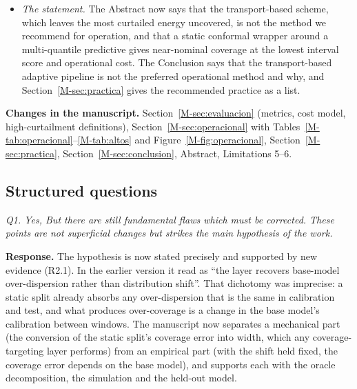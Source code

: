 \documentclass[11pt,a4paper]{article}
\newenvironment{revcomment}
  {\begin{mdframed}[backgroundcolor=quotebg,linecolor=quoterule,linewidth=0.4pt,
    innertopmargin=6pt,innerbottommargin=6pt,skipabove=8pt,skipbelow=8pt]\itshape}
  {\end{mdframed}}
\newcommand{\resp}{\textbf{Response.} }
\newcommand{\where}[1]{\textbf{Changes in the manuscript.} #1}
\begin{document}
\begin{itemize}[leftmargin=*,itemsep=1pt]
\item \emph{The statement.} The Abstract now says that the transport-based scheme, which leaves the most curtailed energy uncovered, is not the method we recommend for operation, and that a static conformal wrapper around a multi-quantile predictive gives near-nominal coverage at the lowest interval score and operational cost. The Conclusion says that the transport-based adaptive pipeline is not the preferred operational method and why, and Section~\ref{M-sec:practica} gives the recommended practice as a list.
\end{itemize}

\where{Section~\ref{M-sec:evaluacion} (metrics, cost model, high-curtailment definitions), Section~\ref{M-sec:operacional} with Tables~\ref{M-tab:operacional}--\ref{M-tab:altos} and Figure~\ref{M-fig:operacional}, Section~\ref{M-sec:practica}, Section~\ref{M-sec:conclusion}, Abstract, Limitations 5--6.}

\subsection*{Structured questions}

\begin{revcomment}
Q1. Yes, But there are still fundamental flaws which must be corrected. These points are not superficial changes but strikes the main hypothesis of the work.
\end{revcomment}
\resp The hypothesis is now stated precisely and supported by new evidence (R2.1). In the earlier version it read as ``the layer recovers base-model over-dispersion rather than distribution shift''. That dichotomy was imprecise: a static split already absorbs any over-dispersion that is the same in calibration and test, and what produces over-coverage is a change in the base model's calibration between windows. The manuscript now separates a mechanical part (the conversion of the static split's coverage error into width, which any coverage-targeting layer performs) from an empirical part (with the shift held fixed, the coverage error depends on the base model), and supports each with the oracle decomposition, the simulation and the held-out model.
\end{document}
